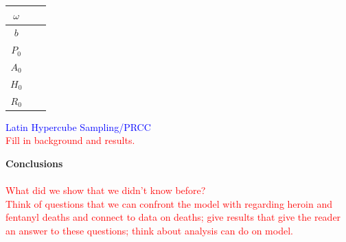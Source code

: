 \documentclass[12pt]{article}
\begin{document}
\begin{center}
\begin{tabular}{|c | c | c|}
\hline

$\omega$ &   \\

 \hline
 
 $b$ &   \\

 \hline
 
 $P_0$ &   \\

 \hline

$A_0$ &   \\

\hline
$H_0$ &   \\

 \hline
 $R_0$ &   \\


 \hline
\end{tabular}

\end{center}




\textcolor{blue}{Latin Hypercube Sampling/PRCC} \\
\textcolor{red}{Fill in background and results.}


\pagebreak
 
\textbf{Conclusions} \\ \\
 \textcolor{red}{What did we show that we didn't know before?} \\
 \textcolor{red}{Think of questions that we can confront the model with regarding heroin and fentanyl deaths and connect to data on deaths; give results that give the reader an answer to these questions; think about analysis can do on model.} \\
 
\end{document}
